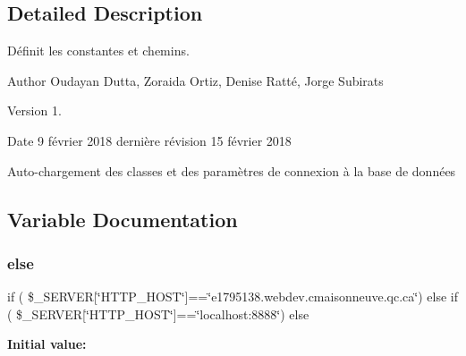 \subsection{Detailed Description}
Définit les constantes et chemins. 

\begin{DoxyAuthor}{Author}
Oudayan Dutta, Zoraida Ortiz, Denise Ratté, Jorge Subirats 
\end{DoxyAuthor}
\begin{DoxyVersion}{Version}
1. 
\end{DoxyVersion}
\begin{DoxyDate}{Date}
9 février 2018 dernière révision 15 février 2018
\end{DoxyDate}
Auto-\/chargement des classes et des paramètres de connexion à la base de données 

\subsection{Variable Documentation}
\mbox{\label{config_8php_af3b267209f6274e2aa137ac1ec2681be}} 
\subsubsection{\texorpdfstring{else}{else}}
{\footnotesize\ttfamily if ( \$\+\_\+\+S\+E\+R\+V\+ER\mbox{[}\char`\"{}H\+T\+T\+P\+\_\+\+H\+O\+ST\char`\"{}\mbox{]}==\char`\"{}e1795138.\+webdev.\+cmaisonneuve.\+qc.\+ca\char`\"{}) else if ( \$\+\_\+\+S\+E\+R\+V\+ER\mbox{[}\char`\"{}H\+T\+T\+P\+\_\+\+H\+O\+ST\char`\"{}\mbox{]}==\char`\"{}localhost\+:8888\char`\"{}) else}

{\bfseries Initial value\+:}
